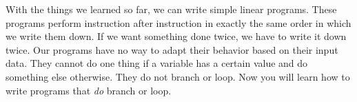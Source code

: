 %
%
With the things we learned so far, we can write simple linear programs.
These programs perform instruction after instruction in exactly the same order in which we write them down.
If we want something done twice, we have to write it down twice.
Our programs have no way to adapt their behavior based on their input data.
They cannot do one thing if a variable has a certain value and do something else otherwise.
They do not branch or loop.
Now you will learn how to write programs that \emph{do} branch or loop.%
%
%
%
%
\endhsection%
%
